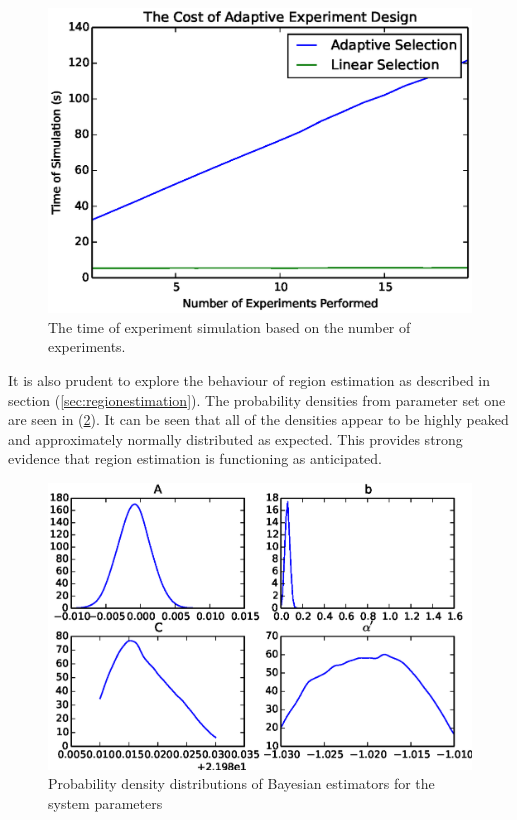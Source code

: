  \begin{figure}[ht!]
\centering
\includegraphics[scale=1.0]{Figures/adaptivetimes.eps}
\caption{The time of experiment simulation based on the number of experiments.}
\label{fig:adaptivetimes}
\end{figure}

It is also prudent to explore the behaviour of region estimation as described in section (\ref{sec:regionestimation}). The probability densities from parameter set one are seen in (\ref{fig:probdensities}). It can be seen that all of the densities appear to be highly peaked and approximately normally distributed as expected. This provides strong evidence that region estimation is functioning as anticipated. 

 \begin{figure}[ht!]
\centering
\includegraphics[scale=1.0]{Figures/probdensities.eps}
\caption{Probability density distributions of Bayesian estimators for the system parameters}
\label{fig:probdensities}
\end{figure}